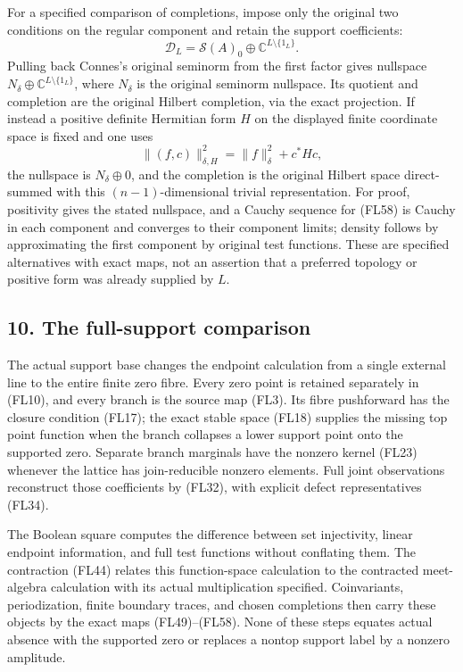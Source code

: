 \documentclass[
  10pt,
]{article}
\begin{document}
For a specified comparison of completions, impose only the original two
conditions on the regular component and retain the support coefficients:
\[
\mathcal D_L=\mathcal S(A)_0\oplus\mathbb C^{L\setminus\{1_L\}}.
\tag{FL57}
\] Pulling back Connes's original seminorm from the first factor gives
nullspace \(N_\delta\oplus\mathbb C^{L\setminus\{1_L\}}\), where
\(N_\delta\) is the original seminorm nullspace. Its quotient and
completion are the original Hilbert completion, via the exact
projection. If instead a positive definite Hermitian form \(H\) on the
displayed finite coordinate space is fixed and one uses \[
\|(f,c)\|_{\delta,H}^2=\|f\|_\delta^2+c^*Hc,
\tag{FL58}
\] the nullspace is \(N_\delta\oplus0\), and the completion is the
original Hilbert space direct-summed with this \((n-1)\)-dimensional
trivial representation. For proof, positivity gives the stated
nullspace, and a Cauchy sequence for (FL58) is Cauchy in each component
and converges to their component limits; density follows by
approximating the first component by original test functions. These are
specified alternatives with exact maps, not an assertion that a
preferred topology or positive form was already supplied by \(L\).

\subsection{10. The full-support
comparison}\label{the-full-support-comparison}

The actual support base changes the endpoint calculation from a single
external line to the entire finite zero fibre. Every zero point is
retained separately in (FL10), and every branch is the source map (FL3).
Its fibre pushforward has the closure condition (FL17); the exact stable
space (FL18) supplies the missing top point function when the branch
collapses a lower support point onto the supported zero. Separate branch
marginals have the nonzero kernel (FL23) whenever the lattice has
join-reducible nonzero elements. Full joint observations reconstruct
those coefficients by (FL32), with explicit defect representatives
(FL34).

The Boolean square computes the difference between set injectivity,
linear endpoint information, and full test functions without conflating
them. The contraction (FL44) relates this function-space calculation to
the contracted meet-algebra calculation with its actual multiplication
specified. Coinvariants, periodization, finite boundary traces, and
chosen completions then carry these objects by the exact maps
(FL49)--(FL58). None of these steps equates actual absence with the
supported zero or replaces a nontop support label by a nonzero
amplitude.
\end{document}
